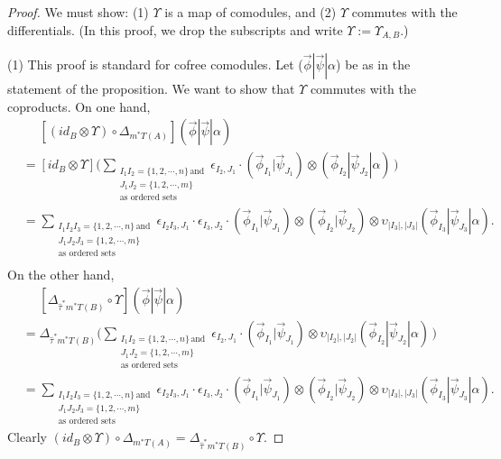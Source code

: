 \begin{proof}
We must show: (1) $\Upsilon$ is a map of comodules, and 
(2) $\Upsilon$ commutes with the differentials. (In this 
proof, we drop the subscripts and write 
$\Upsilon := \Upsilon_{A, B}$.)

(1) This proof is standard for cofree comodules. 
Let ($\vec{\phi} | \vec{\psi} | \alpha$) be as 
in the statement of the proposition. We want to 
show that $\Upsilon$ commutes with the coproducts. 
On one hand,
\begin{align*}
&\phantom{{}={}}
[(id_B \otimes \Upsilon) \circ 
  \Delta_{m^*T(A)}] 
  ( \vec{\phi} | \vec{\psi} | \alpha ) \\
&= [id_B \otimes \Upsilon]
	\big( \sum_{\substack{I_1I_2 = \{1,2,\cdots,n\} \, \textrm{and} \\ 
						  J_1J_2 = \{1,2,\cdots,m\} \\
				          \textrm{as ordered sets}}} 
    \epsilon_{I_2,J_1}\cdot 
    (\vec{\phi}_{I_1} | \vec{\psi}_{J_1}) \otimes (\vec{\phi}_{I_2} | \vec{\psi}_{J_2} | \alpha) \, \big) \\
&= \sum_{\substack{I_1I_2I_3 = \{1,2,\cdots,n\} \, \textrm{and} \\ 
				   J_1J_2J_3 = \{1,2,\cdots,m\} \\
				   \textrm{as ordered sets}}} 
    \epsilon_{I_2I_3,J_1}\cdot \epsilon_{I_3,J_2}\cdot
    (\vec{\phi}_{I_1} | \vec{\psi}_{J_1}) \otimes 
    (\vec{\phi}_{I_2} | \vec{\psi}_{J_2}) \otimes 
    \upsilon_{|I_3|,|J_3|}(\vec{\phi}_{I_3} | \vec{\psi}_{J_3} | \alpha). \\
\end{align*}
On the other hand,
\begin{align*}
&\phantom{{}={}}
[\Delta_{\hat{\tau}^*m^*T(B)} 
  \circ \Upsilon ]
  ( \vec{\phi} | \vec{\psi} | \alpha ) \\
&= \Delta_{\hat{\tau}^*m^*T(B)}
	\big( \sum_{\substack{I_1I_2 = \{1,2,\cdots,n\} \, \textrm{and} \\ 
						  J_1J_2 = \{1,2,\cdots,m\} \\
				          \textrm{as ordered sets}}}
	\epsilon_{I_2,J_1} \cdot 
  (\vec{\phi}_{I_1} | \vec{\psi}_{J_1}) \otimes 
    \upsilon_{|I_2|,|J_2|}(\vec{\phi}_{I_2} | \vec{\psi}_{J_2} | \alpha) \, \big)\\
&= \sum_{\substack{I_1I_2I_3 = \{1,2,\cdots,n\} \, \textrm{and} \\ 
				   J_1J_2J_3 = \{1,2,\cdots,m\} \\
				   \textrm{as ordered sets}}} 
    \epsilon_{I_2I_3,J_1}\cdot \epsilon_{I_3,J_2}\cdot
    (\vec{\phi}_{I_1} | \vec{\psi}_{J_1}) \otimes 
    (\vec{\phi}_{I_2} | \vec{\psi}_{J_2}) \otimes 
    \upsilon_{|I_3|,|J_3|}(\vec{\phi}_{I_3} | \vec{\psi}_{J_3} | \alpha).   				          
\end{align*}
Clearly 
$(id_B \otimes \Upsilon) \circ 
\Delta_{m^*T(A)} = 
\Delta_{\hat{\tau}^*m^*T(B)} 
\circ \Upsilon$.


\end{proof}
